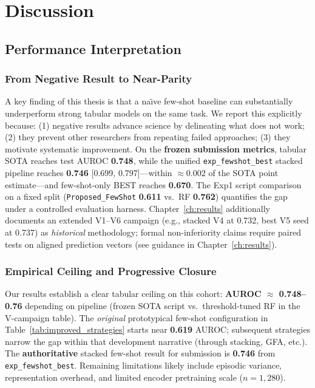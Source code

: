 \chapter{Discussion}
\label{ch:discussion}

\section{Performance Interpretation}

\subsection{From Negative Result to Near-Parity}

A key finding of this thesis is that a na\"{\i}ve few-shot baseline can substantially underperform strong tabular models on the same task. We report this explicitly because: (1) negative results advance science by delineating what does not work; (2) they prevent other researchers from repeating failed approaches; (3) they motivate systematic improvement. On the \textbf{frozen submission metrics}, tabular SOTA reaches test AUROC \textbf{0.748}, while the unified \texttt{exp\_fewshot\_best} stacked pipeline reaches \textbf{0.746} [0.699, 0.797]---within $\approx$0.002 of the SOTA point estimate---and few-shot-only BEST reaches \textbf{0.670}. The Exp1 script comparison on a fixed split (\texttt{Proposed\_FewShot} \textbf{0.611} vs.\ RF \textbf{0.762}) quantifies the gap under a controlled evaluation harness. Chapter~\ref{ch:results} additionally documents an extended V1--V6 campaign (e.g., stacked V4 at 0.732, best V5 seed at 0.737) as \emph{historical} methodology; formal non-inferiority claims require paired tests on aligned prediction vectors (see guidance in Chapter~\ref{ch:results}).

\subsection{Empirical Ceiling and Progressive Closure}

Our results establish a clear tabular ceiling on this cohort: \textbf{AUROC $\approx$ 0.748--0.76} depending on pipeline (frozen SOTA script vs.\ threshold-tuned RF in the V-campaign table). The \emph{original} prototypical few-shot configuration in Table~\ref{tab:improved_strategies} starts near \textbf{0.619} AUROC; subsequent strategies narrow the gap within that development narrative (through stacking, GFA, etc.). The \textbf{authoritative} stacked few-shot result for submission is \textbf{0.746} from \texttt{exp\_fewshot\_best}. Remaining limitations likely include episodic variance, representation overhead, and limited encoder pretraining scale ($n=1{,}280$).

